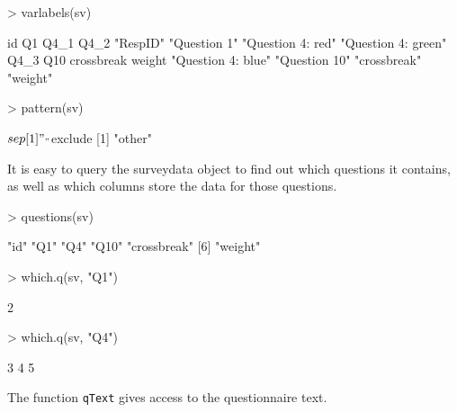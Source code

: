 \documentclass[a4paper]{article}
\begin{document}
\begin{Schunk}
\begin{Sinput}
> varlabels(sv)
\end{Sinput}
\begin{Soutput}
                 id                  Q1                Q4_1                Q4_2 
           "RespID"        "Question 1"   "Question 4: red" "Question 4: green" 
               Q4_3                 Q10          crossbreak              weight 
 "Question 4: blue"       "Question 10"        "crossbreak"            "weight" 
\end{Soutput}
\begin{Sinput}
> pattern(sv)
\end{Sinput}
\begin{Soutput}
$sep
[1] "_"

$exclude
[1] "other"
\end{Soutput}
\end{Schunk}

It is easy to query the surveydata object to find out which questions it contains, as well as which columns store the data for those questions.

\begin{Schunk}
\begin{Sinput}
> questions(sv)
\end{Sinput}
\begin{Soutput}
[1] "id"         "Q1"         "Q4"         "Q10"        "crossbreak"
[6] "weight"    
\end{Soutput}
\begin{Sinput}
> which.q(sv, "Q1")
\end{Sinput}
\begin{Soutput}
[1] 2
\end{Soutput}
\begin{Sinput}
> which.q(sv, "Q4")
\end{Sinput}
\begin{Soutput}
[1] 3 4 5
\end{Soutput}
\end{Schunk}

The function \texttt{qText} gives access to the questionnaire text.
\end{document}
